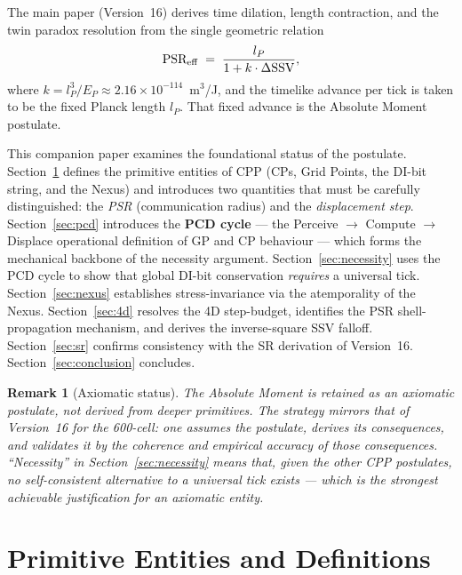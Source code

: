 \documentclass[12pt]{article}
\newtheorem{remark}[theorem]{Remark}
\begin{document}
The main paper (Version~16) derives time dilation, length contraction, and the
twin paradox resolution from the single geometric relation
\begin{equation}
  \text{PSR}_{\rm eff} \;=\; \frac{l_P}{1 + k\cdot\Delta\text{SSV}},
  \label{eq:PSR}
\end{equation}
where $k = l_P^3/E_P \approx 2.16\times10^{-114}$~m$^3$/J, and the timelike
advance per tick is taken to be the fixed Planck length $l_P$.  That fixed
advance is the Absolute Moment postulate.

This companion paper examines the foundational status of the postulate.
Section~\ref{sec:entities} defines the primitive entities of CPP (CPs, Grid
Points, the DI-bit string, and the Nexus) and introduces two quantities that
must be carefully distinguished: the \emph{PSR} (communication radius) and
the \emph{displacement step}.  Section~\ref{sec:pcd} introduces the
\textbf{PCD cycle} --- the Perceive $\to$ Compute $\to$ Displace operational
definition of GP and CP behaviour --- which forms the mechanical backbone of
the necessity argument.  Section~\ref{sec:necessity} uses the PCD cycle to
show that global DI-bit conservation \emph{requires} a universal tick.
Section~\ref{sec:nexus} establishes stress-invariance via the atemporality of
the Nexus.  Section~\ref{sec:4d} resolves the 4D step-budget, identifies the
PSR shell-propagation mechanism, and derives the inverse-square SSV falloff.
Section~\ref{sec:sr} confirms consistency with the SR derivation of
Version~16.  Section~\ref{sec:conclusion} concludes.

\begin{remark}[Axiomatic status]
The Absolute Moment is retained as an \emph{axiomatic postulate}, not derived
from deeper primitives.  The strategy mirrors that of Version~16 for the
600-cell: one assumes the postulate, derives its consequences, and validates it
by the coherence and empirical accuracy of those consequences.  ``Necessity''
in Section~\ref{sec:necessity} means that, given the other CPP postulates,
\emph{no self-consistent alternative} to a universal tick exists --- which
is the strongest achievable justification for an axiomatic entity.
\end{remark}

\section{Primitive Entities and Definitions}
\label{sec:entities}
\end{document}
